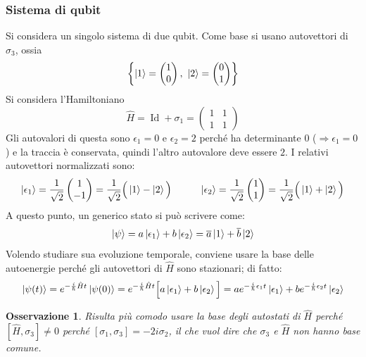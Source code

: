 \documentclass[11pt, a4paper]{scrartcl} %
\numberwithin{equation}{subsection}
\theoremstyle{style2}
\newtheorem{osservazione}{Osservazione}[section]
\theoremstyle{style1}
\begin{document}
\subsubsection{Sistema di qubit}\label{1q}
Si considera un singolo sistema di due qubit.
Come base si usano autovettori di $\sigma _3$, ossia 
\[
\left\{ \ket{1} = \begin{pmatrix} 1 \\ 0 \end{pmatrix} , \ \ket{2} = \begin{pmatrix} 0 \\ 1 \end{pmatrix}  \right\} 
\] 
Si considera l'Hamiltoniano
\[
	\hat{H} = \operatorname{Id} + \sigma _1 = \begin{pmatrix} 1 & 1 \\ 1 & 1 \end{pmatrix} 
\] 
Gli autovalori di questa sono $\epsilon _1 = 0 $ e $\epsilon_2 = 2$ perch\'e ha determinante $0$ ($\Rightarrow  \epsilon _1 = 0$) e la traccia \`e conservata, quindi l'altro autovalore deve essere $2$. 
I relativi autovettori normalizzati sono:
\[
	\ket{\epsilon _1} = \frac{1}{\sqrt{2} }\begin{pmatrix} 1\\ -1 \end{pmatrix} = \frac{1}{\sqrt{2} }\Big(\ket{1} - \ket{2} \Big)  \hspace{1cm} \ket{\epsilon _2}  = \frac{1}{\sqrt{2} } \begin{pmatrix} 1 \\ 1  \end{pmatrix} = \frac{1}{\sqrt{2} } \Big( \ket{1}  + \ket{2} \Big)
\] 
A questo punto, un generico stato si pu\`o scrivere come:
\[
\ket{\psi } = a \ket{\epsilon _1 } + b \ket{\epsilon _2} = \overline{a}\ket{1} + \overline{b}\ket{2} 
\] 
Volendo studiare sua evoluzione temporale, conviene usare la base delle autoenergie perch\'e  gli autovettori di $\hat{H}$ sono stazionari; di fatto:
\begin{equation}\label{tempev}
	\ket{\psi (t)} = e^{-\frac{i}{\hbar }\hat{H}  t} \ket{\psi (0)} = e^{-\frac{i}{\hbar }\hat{H}t } \Big[a \ket{\epsilon _1}  + b \ket{\epsilon _2} \Big] = a e^{-\frac{i}{\hbar }\epsilon _1  t} \ket{\epsilon _1} +  b e^{-\frac{i}{\hbar } \epsilon _2 t} \ket{\epsilon _2} 
\end{equation}
\begin{osservazione}
	Risulta pi\`u comodo usare la base degli autostati di $\hat{H}$ perch\'e $[\hat{H} , \sigma _3]\neq 0$ perch\'e $[\sigma _1,\sigma _3] = -2i  \sigma _2$, il che vuol dire che $\sigma _3$ e $\hat{H}$ non hanno base comune.
\end{osservazione}
\end{document}
